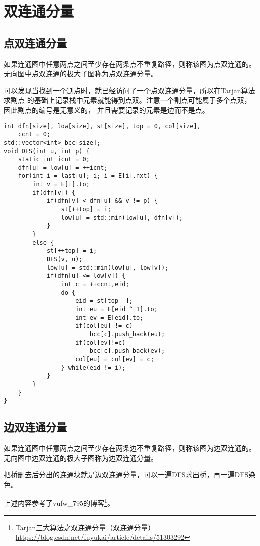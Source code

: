 \section{双连通分量}
\subsection{点双连通分量}
如果连通图中任意两点之间至少存在两条点不重复路径，则称该图为点双连通的。
无向图中点双连通的极大子图称为点双连通分量。

可以发现当找到一个割点时，就已经访问了一个点双连通分量，所以在Tarjan算法求割点
的基础上记录栈中元素就能得到点双。注意一个割点可能属于多个点双，因此割点的编号是无意义的，
并且需要记录的元素是边而不是点。

\begin{lstlisting}
int dfn[size], low[size], st[size], top = 0, col[size],
    ccnt = 0;
std::vector<int> bcc[size];
void DFS(int u, int p) {
    static int icnt = 0;
    dfn[u] = low[u] = ++icnt;
    for(int i = last[u]; i; i = E[i].nxt) {
        int v = E[i].to;
        if(dfn[v]) {
            if(dfn[v] < dfn[u] && v != p) {
                st[++top] = i;
                low[u] = std::min(low[u], dfn[v]);
            }
        }
        else {
            st[++top] = i;
            DFS(v, u);
            low[u] = std::min(low[u], low[v]);
            if(dfn[u] <= low[v]) {
                int c = ++ccnt,eid;
                do {
                    eid = st[top--];
                    int eu = E[eid ^ 1].to;
                    int ev = E[eid].to;
                    if(col[eu] != c)
                        bcc[c].push_back(eu);
                    if(col[ev]!=c)
                        bcc[c].push_back(ev);
                    col[eu] = col[ev] = c;
                } while(eid != i);
            }
        }
    }
}
\end{lstlisting}

\subsection{边双连通分量}
如果连通图中任意两点之间至少存在两条边不重复路径，则称该图为边双连通的。
无向图中边双连通的极大子图称为边双连通分量。

把桥删去后分出的连通块就是边双连通分量，可以一遍DFS求出桥，再一遍DFS染色。

上述内容参考了vufw\_795的博客\footnote{
    Tarjan三大算法之双连通分量（双连通分量）
\url{https://blog.csdn.net/fuyukai/article/details/51303292}
}。
